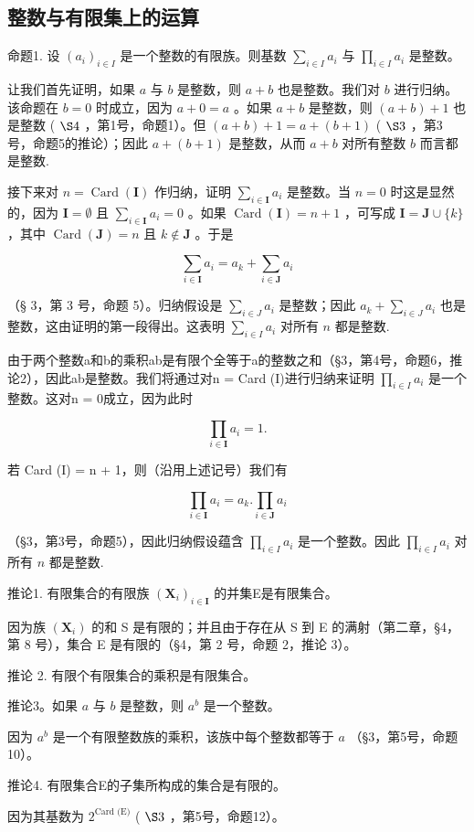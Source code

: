 \subsection{整数与有限集上的运算}

命题1. 设 \((a_i)_{i\in I}\) 是一个整数的有限族。则基数 \(\sum_{i\in I}a_i\) 与 \(\prod_{i\in I}a_i\) 是整数。

让我们首先证明，如果 \(a\) 与 \(b\) 是整数，则 \(a + b\) 也是整数。我们对 \(b\) 进行归纳。该命题在 \(b = 0\) 时成立，因为 \(a + 0 = a\) 。如果 \(a + b\) 是整数，则 \((a + b) + 1\) 也是整数 ( \(\S 4\) ，第1号，命题1）。但 \((a + b) + 1 = a + (b + 1)\) ( \(\S 3\) ，第3号，命题5的推论）；因此 \(a + (b + 1)\) 是整数，从而 \(a + b\) 对所有整数 \(b\) 而言都是整数.

接下来对 \(n = \operatorname{Card}(\mathbf{I})\) 作归纳，证明 \(\sum_{i \in \mathbf{I}} a_i\) 是整数。当 \(n = 0\) 时这是显然的，因为 \(\mathbf{I} = \emptyset\) 且 \(\sum_{i \in \mathbf{I}} a_i = 0\) 。如果 \(\operatorname{Card}(\mathbf{I}) = n + 1\) ，可写成 \(\mathbf{I} = \mathbf{J} \cup \{k\}\) ，其中 \(\operatorname{Card}(\mathbf{J}) = n\) 且 \(k \notin \mathbf{J}\) 。于是

\[
\sum_ {i \in \mathbf {I}} a _ {i} = a _ {k} + \sum_ {i \in \mathbf {J}} a _ {i}
\]

（§ 3，第 3 号，命题 5）。归纳假设是 \(\sum_{i\in J}a_i\) 是整数；因此 \(a_{k} + \sum_{i\in J}a_{i}\) 也是整数，这由证明的第一段得出。这表明 \(\sum_{i\in I}a_{i}\) 对所有 \(n\) 都是整数.

由于两个整数a和b的乘积ab是有限个全等于a的整数之和（§3，第4号，命题6，推论2），因此ab是整数。我们将通过对n = Card (I)进行归纳来证明 \(\prod_{i\in I}a_{i}\) 是一个整数。这对n = 0成立，因为此时

\[
\prod_ {i \in \mathbf {I}} a _ {i} = 1.
\]

若 Card (I) = n + 1，则（沿用上述记号）我们有

\[
\prod_ {i \in \mathbf {I}} a _ {i} = a _ {k}. \prod_ {i \in \mathbf {J}} a _ {i}
\]

（§3，第3号，命题5），因此归纳假设蕴含 \(\prod_{i\in I}a_i\) 是一个整数。因此 \(\prod_{i\in I}a_i\) 对所有 \(n\) 都是整数.

推论1. 有限集合的有限族 \((\mathbf{X}_i)_{i\in \mathbf{I}}\) 的并集E是有限集合。

因为族 \((\mathbf{X}_{i})\) 的和 S 是有限的；并且由于存在从 S 到 E 的满射（第二章，§4，第 8 号），集合 E 是有限的（§4，第 2 号，命题 2，推论 3）。

推论 2. 有限个有限集合的乘积是有限集合。

推论3。如果 \(a\) 与 \(b\) 是整数，则 \(a^b\) 是一个整数。

因为 \(a^b\) 是一个有限整数族的乘积，该族中每个整数都等于 \(a\) （§3，第5号，命题10）。

推论4. 有限集合E的子集所构成的集合是有限的。

因为其基数为 \(2^{\text{Card (E)}}\) ( \(\S 3\) ，第5号，命题12）。


